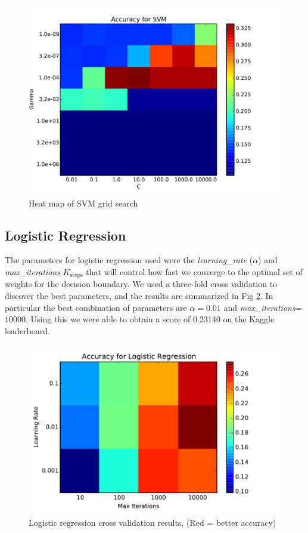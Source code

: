 \documentclass[conference]{IEEEtran}
\begin{document}
\begin{figure}[h]
	\centering
	\includegraphics[scale=0.4]{SVM_grid_search.pdf}
	\caption{Heat map of SVM grid search}
	\label{SVMGrid}
\end{figure}

\subsection{Logistic Regression}
The parameters for logistic regression used were the \emph{learning\_rate} ($\alpha$) and \emph{max\_iterations} $K_{\text{steps}}$ that will control how fast we converge to the optimal set of weights for the decision boundary. We used a three-fold cross validation to discover the best parameters, and the results are summarized in Fig \ref{LR_accuracy}. In particular the best combination of parameters are $\alpha=0.01$ and \emph{max\_iterations}=$10000$. Using this we were able to obtain a score of 0.23140 on the Kaggle leaderboard.

\begin{figure}[h]
	\label{LR_accuracy}
	\centering
	\includegraphics[scale=0.50]{LR_accuracy.pdf}
	\caption{Logistic regression cross validation results, (Red = better accuracy)}
\end{figure}
\end{document}
